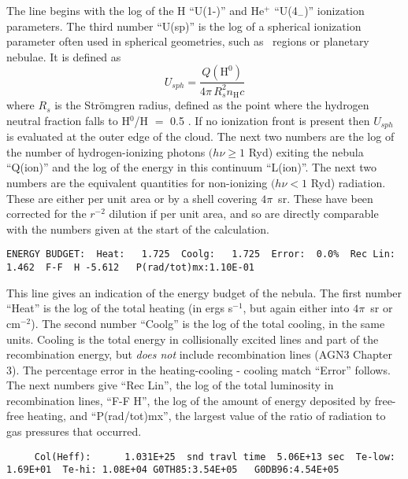 The line begins with the log of the H ``U(1-)'' and He$^+$ ``U(4$_-$)''
ionization parameters.
The third number ``U(sp)'' is the log of a spherical
ionization parameter often used in spherical geometries,
such as \hii\ regions or planetary nebulae.
It is defined as
\begin{equation}
{U_{sph}} = \frac{{Q\left( {{{\mathrm{H}}^{\mathrm{0}}}} \right)}}{{4\pi
\,R_s^2{n_{\mathrm{H}}}c}}%
\end{equation}
where $R_s$ is the Str\"omgren radius,
defined as the point where the hydrogen
neutral fraction falls to H$^0$/H $=$ 0.5 .
If no ionization front is present
then $U_{sph}$ is evaluated at the outer edge of the cloud.
The next two numbers
are the log of the number of hydrogen-ionizing photons
$(h\nu \ge 1$ Ryd) exiting
the nebula ``Q(ion)'' and the log of the energy
in this continuum ``L(ion)''.
The next two numbers are the equivalent quantities for
non-ionizing $(h\nu < 1$ Ryd) radiation.
These are either per unit area or by a shell covering
$4\pi$~sr.
These have been corrected for the $r^{-2}$ dilution if per unit area,
and so are directly comparable with the numbers given at the start of the
calculation.
{\setverbatimfontsize{\tiny}
\begin{verbatim}
ENERGY BUDGET:  Heat:   1.725  Coolg:   1.725  Error:  0.0%  Rec Lin:   1.462  F-F  H -5.612   P(rad/tot)mx:1.10E-01
\end{verbatim}
}

This line gives an indication of the energy budget of the nebula.
The
first number ``Heat'' is the log of the total heating (in ergs s$^{-1}$, but
again either into $4\pi$~sr or cm$^{-2}$).
The second number ``Coolg'' is the log
of the total cooling, in the same units.
Cooling is the total energy in
collisionally excited lines and part of the recombination energy,
but \emph{does not} include recombination lines (AGN3 Chapter 3).
The percentage error
in the heating-cooling - cooling match ``Error'' follows.
The next numbers
give ``Rec Lin'', the log of the total luminosity in recombination lines,
``F-F  H'', the log of the amount of energy deposited by
free-free heating,
and ``P(rad/tot)mx'', the largest value of the ratio of
radiation to gas pressures that occurred.
{\setverbatimfontsize{\tiny}
\begin{verbatim}
     Col(Heff):      1.031E+25  snd travl time  5.06E+13 sec  Te-low: 1.69E+01  Te-hi: 1.08E+04 G0TH85:3.54E+05   G0DB96:4.54E+05
\end{verbatim}
}

